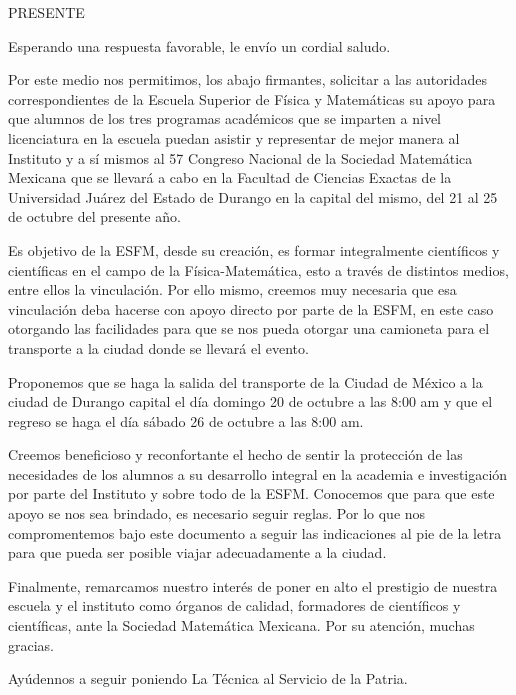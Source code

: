 \documentclass[11pt,a4paper,sans]{moderncv}        %
\begin{document}
\date{27 de septiembre de 2024}
\opening{PRESENTE}
\closing{Esperando una respuesta favorable, le envío un cordial saludo.}

\makelettertitle

\justifying

Por este medio nos permitimos, los abajo firmantes, solicitar a las autoridades correspondientes de la Escuela Superior de Física y Matemáticas su apoyo para que alumnos de los tres programas académicos que se imparten a nivel licenciatura en la escuela puedan asistir y representar de mejor manera al Instituto y a sí mismos al 57 Congreso Nacional de la Sociedad Matemática Mexicana que se llevará a cabo en la Facultad de Ciencias Exactas de la Universidad Juárez del Estado de Durango en la capital del mismo, del 21 al 25 de octubre del presente año.

Es objetivo de la ESFM, desde su creación, es formar integralmente científicos y científicas en el campo de la Física-Matemática, esto a través de distintos medios, entre ellos la vinculación. Por ello mismo, creemos muy necesaria que esa vinculación deba hacerse con apoyo directo por parte de la ESFM, en este caso otorgando las facilidades para que se nos pueda otorgar una camioneta para el transporte a la ciudad donde se llevará el evento.

Proponemos que se haga la salida del transporte de la Ciudad de México a la ciudad de Durango capital el día domingo 20 de octubre a las 8:00 am y que el regreso se haga el día sábado 26 de octubre a las 8:00 am.   

Creemos beneficioso y reconfortante el hecho de sentir la protección de las necesidades de los alumnos a su desarrollo integral en la academia e investigación por parte del Instituto y sobre todo de la ESFM. Conocemos que para que este apoyo se nos sea brindado, es necesario seguir reglas. Por lo que nos compromentemos bajo este documento a seguir las indicaciones al pie de la letra para que pueda ser posible viajar adecuadamente a la ciudad.

Finalmente, remarcamos nuestro interés de poner en alto el prestigio de nuestra escuela y el instituto como órganos de calidad, formadores de científicos y científicas, ante la Sociedad Matemática Mexicana. Por su atención, muchas gracias.

Ayúdennos a seguir poniendo La Técnica al Servicio de la Patria.
\end{document}
